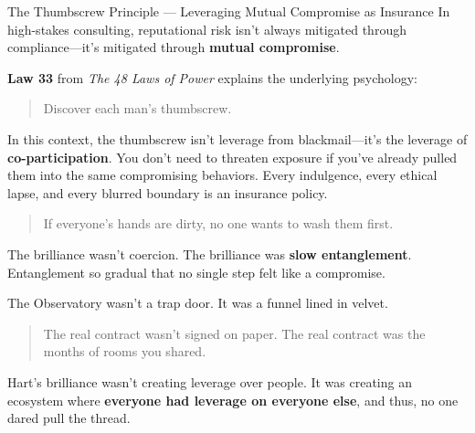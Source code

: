 \medskip

\begin{PhilosophicalSidebar}{The Thumbscrew Principle --- Leveraging Mutual Compromise as Insurance}
In high-stakes consulting, reputational risk isn’t always mitigated through compliance—it’s mitigated through 
\textbf{mutual compromise}.  

\medskip

\textbf{Law 33} from \textit{The 48 Laws of Power} explains the underlying psychology:  

\begin{quote}
Discover each man’s thumbscrew.
\end{quote}

In this context, the thumbscrew isn’t leverage from blackmail—it’s the leverage of \textbf{co-participation}. 
You don’t need to threaten exposure if you’ve already pulled them into the same compromising behaviors. Every 
indulgence, every ethical lapse, and every blurred boundary is an insurance policy.  

\begin{quote}
If everyone’s hands are dirty, no one wants to wash them first.
\end{quote}
\end{PhilosophicalSidebar}

\medskip



  



The brilliance wasn’t coercion.  The brilliance was \textbf{slow entanglement}. 
Entanglement so gradual that no single step felt like a compromise.

The Observatory wasn’t a trap door.  It was a funnel lined in velvet.

\begin{quote}
  The real contract wasn’t signed on paper.  The real contract was the months of rooms you shared.
\end{quote}

Hart’s brilliance wasn’t creating leverage over people. It was creating an ecosystem where 
\textbf{everyone had leverage on everyone else}, and thus, no one dared pull the thread.

\medskip

